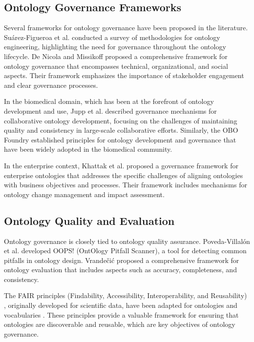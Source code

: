 \documentclass[conference]{IEEEtran}
\begin{document}
\subsection{Ontology Governance Frameworks}

Several frameworks for ontology governance have been proposed in the literature. Suárez-Figueroa et al. \cite{suarez2011survey} conducted a survey of methodologies for ontology engineering, highlighting the need for governance throughout the ontology lifecycle. De Nicola and Missikoff \cite{de2020ontology} proposed a comprehensive framework for ontology governance that encompasses technical, organizational, and social aspects. Their framework emphasizes the importance of stakeholder engagement and clear governance processes.

In the biomedical domain, which has been at the forefront of ontology development and use, Jupp et al. \cite{jupp2016collaborative} described governance mechanisms for collaborative ontology development, focusing on the challenges of maintaining quality and consistency in large-scale collaborative efforts. Similarly, the OBO Foundry \cite{smith2007obo} established principles for ontology development and governance that have been widely adopted in the biomedical community.

In the enterprise context, Khattak et al. \cite{khattak2016enterprise} proposed a governance framework for enterprise ontologies that addresses the specific challenges of aligning ontologies with business objectives and processes. Their framework includes mechanisms for ontology change management and impact assessment.

\subsection{Ontology Quality and Evaluation}

Ontology governance is closely tied to ontology quality assurance. Poveda-Villalón et al. \cite{poveda2014oops} developed OOPS! (OntOlogy Pitfall Scanner), a tool for detecting common pitfalls in ontology design. Vrandečić \cite{vrandecic2009ontology} proposed a comprehensive framework for ontology evaluation that includes aspects such as accuracy, completeness, and consistency.

The FAIR principles (Findability, Accessibility, Interoperability, and Reusability) \cite{wilkinson2016fair}, originally developed for scientific data, have been adapted for ontologies and vocabularies \cite{garijo2020fair}. These principles provide a valuable framework for ensuring that ontologies are discoverable and reusable, which are key objectives of ontology governance.
\end{document}
